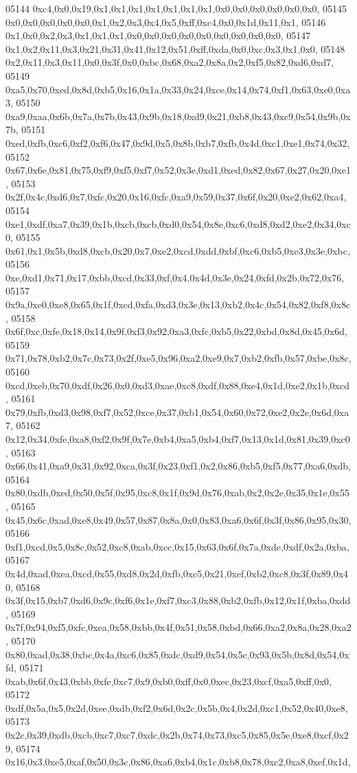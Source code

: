 \begin{DoxyCode}
05144   0xc4,0x0,0x19,0x1,0x1,0x1,0x1,0x1,0x1,0x1,0x0,0x0,0x0,0x0,0x0,0x0,
05145   0x0,0x0,0x0,0x0,0x0,0x1,0x2,0x3,0x4,0x5,0xff,0xc4,0x0,0x1d,0x11,0x1,
05146   0x1,0x0,0x2,0x3,0x1,0x1,0x1,0x0,0x0,0x0,0x0,0x0,0x0,0x0,0x0,0x0,
05147   0x1,0x2,0x11,0x3,0x21,0x31,0x41,0x12,0x51,0xff,0xda,0x0,0xc,0x3,0x1,0x0,
05148   0x2,0x11,0x3,0x11,0x0,0x3f,0x0,0xbc,0x68,0xa2,0x8a,0x2,0xf5,0x82,0xd6,0xd7,
05149   0xa5,0x70,0xed,0x8d,0xb5,0x16,0x1a,0x33,0x24,0xce,0x14,0x74,0xf1,0x63,0xe0,0xa3,
05150   0xa9,0xaa,0x6b,0x7a,0x7b,0x43,0x9b,0x18,0xd9,0x21,0xb8,0x43,0xc9,0x54,0x9b,0x7b,
05151   0xed,0xfb,0xc6,0xf2,0xf6,0x47,0x9d,0x5,0x8b,0xb7,0xfb,0x4d,0xc1,0xe1,0x74,0x32,
05152   0x67,0x6e,0x81,0x75,0xf9,0xf5,0xf7,0x52,0x3e,0xd1,0xed,0x82,0x67,0x27,0x20,0xe1,
05153   0x2f,0x4c,0xd6,0x7,0xfc,0x20,0x16,0xfc,0xa9,0x59,0x37,0x6f,0x20,0xe2,0x62,0xa4,
05154   0xe1,0xdf,0xa7,0x39,0x1b,0xcb,0xcb,0xd0,0x54,0x8e,0xc6,0xd8,0xd2,0xe2,0x34,0xc0,
05155   0x61,0x1,0x5b,0xd8,0xcb,0x20,0x7,0xe2,0xcd,0xdd,0xbf,0xc6,0xb5,0xe3,0x3e,0xbc,
05156   0xe,0xd1,0x71,0x17,0xbb,0xcd,0x33,0xf,0x4,0x4d,0x3e,0x24,0xfd,0x2b,0x72,0x76,
05157   0x9a,0xe0,0xe8,0x65,0x1f,0xcd,0xfa,0xd3,0x3e,0x13,0xb2,0x4c,0x54,0x82,0xf8,0x8c,
05158   0x6f,0xc,0xfe,0x18,0x14,0x9f,0xf3,0x92,0xa3,0xfc,0xb5,0x22,0xbd,0x8d,0x45,0x6d,
05159   0x71,0x78,0xb2,0x7c,0x73,0x2f,0xe5,0x96,0xa2,0xe9,0x7,0xb2,0xfb,0x57,0xbe,0x8c,
05160   0xcd,0xeb,0x70,0xdf,0x26,0x0,0xd3,0xae,0xc8,0xdf,0x88,0xe4,0x1d,0xe2,0x1b,0xcd,
05161   0x79,0xfb,0xd3,0x98,0xf7,0x52,0xce,0x37,0xb1,0x54,0x60,0x72,0xe2,0x2e,0x6d,0xa7,
05162   0x12,0x34,0xfe,0xa8,0xf2,0x9f,0x7e,0xb4,0xa5,0xb4,0xf7,0x13,0x1d,0x81,0x39,0xc0,
05163   0x66,0x41,0xa9,0x31,0x92,0xca,0x3f,0x23,0xf1,0x2,0x86,0xb5,0xf5,0x77,0xa6,0xdb,
05164   0x80,0xdb,0xed,0x50,0x5f,0x95,0xc8,0x1f,0x9d,0x76,0xab,0x2,0x2e,0x35,0x1e,0x55,
05165   0x45,0x6c,0xad,0xe8,0x49,0x57,0x87,0x8a,0x0,0x83,0xa6,0x6f,0x3f,0x86,0x95,0x30,
05166   0xf1,0xcd,0x5,0x8c,0x52,0xc8,0xab,0xcc,0x15,0x63,0x6f,0x7a,0xde,0xdf,0x2a,0xba,
05167   0x4d,0xad,0xea,0xcd,0x55,0xd8,0x2d,0xfb,0xc5,0x21,0xef,0xb2,0xc8,0x3f,0x89,0x40,
05168   0x3f,0x15,0xb7,0xd6,0x9c,0xf6,0x1e,0xf7,0xc3,0x88,0xb2,0xfb,0x12,0x1f,0xba,0xdd,
05169   0x7f,0x94,0xf5,0xfc,0xea,0x58,0xbb,0x4f,0x51,0x58,0xbd,0x66,0xa2,0x8a,0x28,0xa2,
05170   0x80,0xad,0x38,0xbc,0x4a,0xc6,0x85,0xdc,0xd9,0x54,0x5c,0x93,0x5b,0x8d,0x54,0xfd,
05171   0xab,0x6f,0x43,0xbb,0xfe,0xc7,0x9,0xb0,0xff,0x0,0xec,0x23,0xcf,0xa5,0xff,0x0,
05172   0xdf,0x5a,0x5,0x2d,0xee,0xdb,0xf2,0x6d,0x2c,0x5b,0x4,0x2d,0xc1,0x52,0x40,0xe8,
05173   0x2c,0x39,0xdb,0xcb,0xc7,0xc7,0xdc,0x2b,0x74,0x73,0xc5,0x85,0x5e,0xe8,0xcf,0x29,
05174   0x16,0x3,0xe5,0xaf,0x50,0x3c,0x86,0xa6,0xb4,0x1c,0xb8,0x78,0xc2,0xa8,0xef,0x1d,

\end{DoxyCode}
